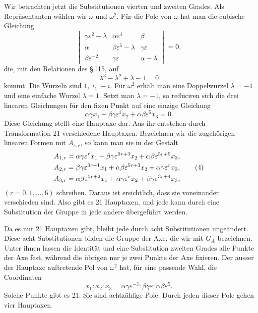 \documentclass[11pt]{article}
\newcommand{\eps}{\varepsilon}
\begin{document}
Wir betrachten jetzt die Substitutionen vierten und zweiten Grades. Als Repräsentanten wählen wir \(\omega\) und \(\omega^2\). Für die Pole von \(\omega\) hat man die cubische Gleichung
\begin{equation}
\begin{vmatrix}
\gamma\eps^2-\lambda&\alpha\eps^4&\beta\\
\alpha&\beta\eps^5-\lambda&\gamma\eps\\
\beta\eps^{-2}&\gamma\eps&\alpha-\lambda
\end{vmatrix}=0,
\tag{1}
\end{equation}
die, mit den Relationen des \S\,115, auf
\begin{equation}
\lambda^3-\lambda^2+\lambda-1=0
\tag{2}
\end{equation}
kommt. Die Wurzeln sind \(1,\ i,\ -i\). Für \(\omega^2\) erhält man eine Doppelwurzel \(\lambda=-1\) und eine einfache Wurzel \(\lambda=1\). Setzt man \(\lambda=-1\), so reduciren sich die drei linearen Gleichungen für den fixen Punkt auf eine einzige Gleichung
\begin{equation}
\alpha\gamma x_1+\beta\gamma\eps^3x_2+\alpha\beta\eps^5x_3=0.
\tag{3}
\end{equation}
Diese Gleichung stellt eine Hauptaxe dar. Aus ihr entstehen durch Transformation 21 verschiedene Hauptaxen. Bezeichnen wir die zugehörigen linearen Formen mit \(A_{s,r}\), so kann man sie in der Gestalt
\begin{align}
A_{1,r}&=\alpha\gamma\eps^{r}x_1+\beta\gamma\eps^{3r+3}x_2+\alpha\beta\eps^{5r+5}x_3,\notag\\
A_{2,r}&=\beta\gamma\eps^{3r+1}x_1+\alpha\beta\eps^{5r+3}x_2+\alpha\gamma\eps^{r}x_3,\tag{4}\\
A_{3,r}&=\alpha\beta\eps^{5r+2}x_1+\alpha\gamma\eps^{r}x_2+\beta\gamma\eps^{3r+4}x_3,\notag
\end{align}
\((r=0,1,\ldots,6)\) schreiben. Daraus ist ersichtlich, dass sie voneinander verschieden sind. Also gibt es 21 Hauptaxen, und jede kann durch eine Substitution der Gruppe in jede andere übergeführt werden.

Da es nur 21 Hauptaxen gibt, bleibt jede durch acht Substitutionen ungeändert. Diese acht Substitutionen bilden die Gruppe der Axe, die wir mit \(G_A\) bezeichnen. Unter ihnen lassen die Identität und eine Substitution zweiten Grades alle Punkte der Axe fest, während die übrigen nur je zwei Punkte der Axe fixieren. Der ausser der Hauptaxe auftretende Pol von \(\omega^2\) hat, für eine passende Wahl, die Coordinaten
\begin{equation}
x_1:x_2:x_3=\alpha\gamma\eps^{-3}:\beta\gamma\eps:\alpha\beta\eps^5.
\tag{5}
\end{equation}
Solche Punkte gibt es 21. Sie sind achtzählige Pole. Durch jeden dieser Pole gehen vier Hauptaxen.
\end{document}
